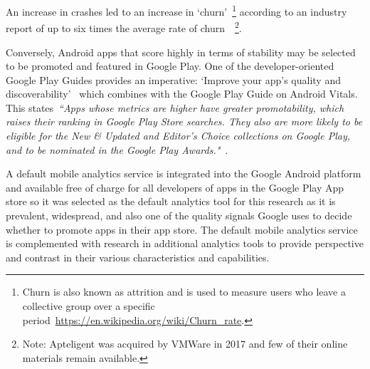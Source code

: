 An increase in crashes led to an increase in `churn'~\footnote{Churn is also known as attrition and is used to measure users who leave a collective group over a specific period~\url{https://en.wikipedia.org/wiki/Churn_rate}.} according to an industry report of up to six times the average rate of churn~\citep{levy2016_crash_and_churn_report, levy2017_the_crash_and_burn_report_findings}~\footnote{Note: Apteligent was acquired by VMWare in 2017 and few of their online materials remain available.}. %

Conversely, Android apps that score highly in terms of stability may be selected to be promoted and featured in Google Play. One of the developer-oriented Google Play Guides provides an imperative: `Improve your app’s quality and discoverability'~\citep{android_store_listing_guide} which combines with the Google Play Guide on Android Vitals. This states~\emph{``Apps whose metrics are higher have greater promotability, which raises their ranking in Google Play Store searches. They also are more likely to be eligible for the New \& Updated and Editor's Choice collections on Google Play, and to be nominated in the Google Play Awards."}~\citep{android_android_vitals_guide}. %

A default mobile analytics service is integrated into the Google Android platform and available free of charge for all developers of apps in the Google Play App store so it was selected as the default analytics tool for this research as it is prevalent, widespread, and also one of the quality signals Google uses to decide whether to promote apps in their app store. The default mobile analytics service is complemented with research in additional analytics tools to provide perspective and contrast in their various characteristics and capabilities.

\citep{android_guidelines_core_app_quality}

